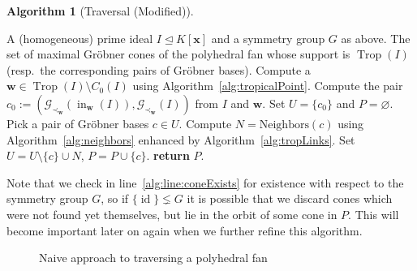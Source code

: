 \documentclass[
  paper=a4,
  titlepage,
  bibliography=totoc,
  listof=totoc,
  pagesize=pdftex
]{scrartcl}
\numberwithin{figure}{section}
\numberwithin{equation}{section}
\numberwithin{table}{section}
\let\vec\mathbf
\let\idealof\trianglelefteq
\DeclareMathOperator{\Trop}{Trop}
\DeclareMathOperator{\initial}{in}
\DeclareMathOperator{\id}{id}
\theoremstyle{definition}
\newtheorem{algo}[definition]{Algorithm}
\numberwithin{definition}{section}
\begin{document}
\begin{algo}[Traversal (Modified)]\
  \label{alg:traversalMod}
  \begin{algorithmic}[1]
    \Require A (homogeneous) prime ideal $I \idealof K[\vec x]$ and a symmetry group $G$
      as above.
    \Ensure The set of maximal Gröbner cones of the polyhedral fan whose support is
      $\Trop(I)$ (resp.\ the corresponding pairs of Gröbner bases).
    \State Compute a $\vec w \in \Trop(I) \setminus C_0(I)$ using
      Algorithm~\ref{alg:tropicalPoint}.
    \State Compute the pair $c_0 := (\mathcal G_{\prec_{\vec w}}(\initial_{\vec w}(I)),
      \mathcal G_{\prec_{\vec w}}(I))$ from $I$ and $\vec w$.
    \State Set $U = \{ c_0 \}$ and $P = \varnothing$.
      \State Pick a pair of Gröbner bases $c \in U$.
       \label{alg:line:coneExists}
        \State Compute $N = \mathrm{Neighbors}(c)$ using Algorithm~\ref{alg:neighbors}
          enhanced by Algorithm~\ref{alg:tropLinks}.
        \State Set $U = U \setminus \{ c \} \cup N$, $P = P \cup \{ c \}$.
      \EndIf
    \EndWhile
    \State\textbf{return} $P$.
  \end{algorithmic}
\end{algo}

Note that we check in line~\ref{alg:line:coneExists} for existence with respect to the
symmetry group $G$, so if $\{ \id \} \lneq G$ it is possible that we discard cones which
were not found yet themselves, but lie in the orbit of some cone in $P$. This will become
important later on again when we further refine this algorithm.

\begin{figure}[tbhp]
  \centering
  \caption{Naive approach to traversing a polyhedral fan}
  \label{fig:naive}
\end{figure}
\end{document}
